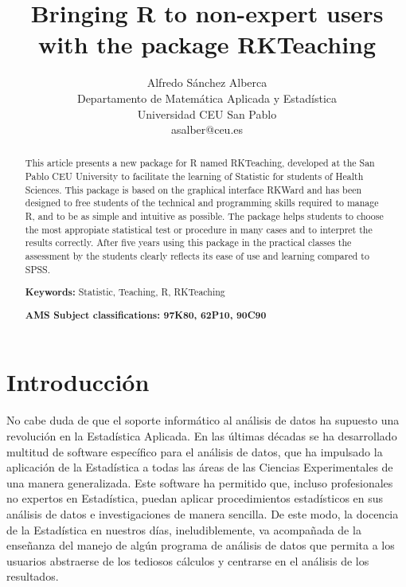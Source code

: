 \documentclass[10pt,twoside,spanish]{article}
\numberwithin{equation}{section}
\begin{document}
\title{%
\vspace*{-2cm}
\textbf{Bringing R to non-expert users with the package RKTeaching} 
%
\vspace*{-0.2cm}%
}
\author{Alfredo Sánchez Alberca\\
Departamento de Matemática Aplicada y Estadística \\
Universidad CEU San Pablo\\
asalber@ceu.es}
\date{}
\maketitle

\begin{abstract}
This article presents  a new package for R named RKTeaching, developed at the San Pablo CEU University to facilitate the learning of
Statistic for students of Health Sciences. This package is based on the graphical interface RKWard and has been designed to free students of
the technical and programming skills required to manage R, and to be as simple and intuitive as possible. The package helps students to
choose the most appropiate statistical test or procedure in many cases and to interpret the results correctly. After five years using this
package in the practical classes the assessment by the students clearly reflects its ease of use and learning compared to SPSS.
\medskip

\noindent\textbf{Keywords:} Statistic, Teaching, R, RKTeaching

\noindent\textbf{AMS Subject classifications: 97K80, 62P10, 90C90}

\end{abstract}


\section{Introducción}
No cabe duda de que el soporte informático al análisis de datos ha supuesto una revolución en la Estadística Aplicada.
En las últimas décadas se ha desarrollado multitud de software específico para el análisis de datos, que ha impulsado la aplicación de la
Estadística a todas las áreas de las Ciencias Experimentales de una manera generalizada.
Este software ha permitido que, incluso profesionales no expertos en Estadística, puedan aplicar procedimientos estadísticos en sus análisis
de datos e investigaciones de manera sencilla.
De este modo, la docencia de la Estadística en nuestros días, ineludiblemente, va acompañada de la enseñanza del manejo
de algún programa de análisis de datos que permita a los usuarios abstraerse de los tediosos cálculos y centrarse en el análisis de los resultados.
\end{document}
